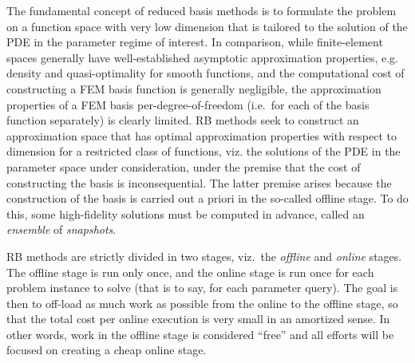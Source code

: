 \documentclass[onecolumn, twoside, a4paper, 11pt]{article}
\begin{document}
The fundamental concept of reduced basis methods is to formulate the problem on
a function space with very low dimension that is tailored to the solution of the
PDE in the parameter regime of interest. In comparison, while finite-element spaces
generally have well-established asymptotic approximation properties, e.g. density and
quasi-optimality for smooth functions, and the computational cost of constructing a FEM basis
function is generally negligible, the approximation properties of a FEM basis per-degree-of-freedom
(i.e.~for each of the basis function separately) is clearly limited. RB methods seek
to construct an approximation space that has optimal approximation properties with respect
to dimension for a restricted class of functions, viz. the solutions of the PDE in the parameter space
under consideration, under the premise that the cost of constructing the basis is inconsequential. The
latter premise arises because the construction of the basis is carried out a priori in the so-called
offline stage. To do this, some high-fidelity solutions must be computed in advance, called
an \emph{ensemble} of \emph{snapshots}.

RB methods are strictly divided in two stages, viz.~the \emph{offline} and
\emph{online} stages. The offline stage is run only once, and the online stage
is run once for each problem instance to solve (that is to say, for each
parameter query). The goal is then to off-load as much work as possible from the
online to the offline stage, so that the total cost per online execution is very
small in an amortized sense. In other words, work in the offline stage is
considered ``free'' and all efforts will be focused on creating a cheap online stage.
\end{document}
